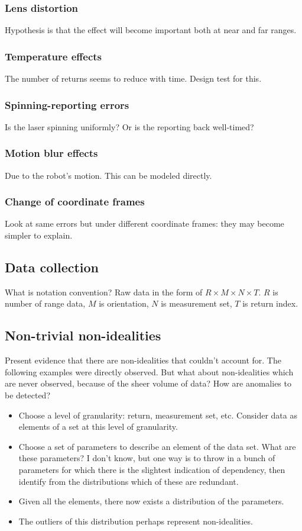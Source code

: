 \documentclass[a4paper, 11pt]{article}
\begin{document}
\subsubsection*{Lens distortion}
Hypothesis is that the effect will become important both at near and far ranges. 

\subsubsection*{Temperature effects}
The number of returns seems to reduce with time. Design test for this.

\subsubsection*{Spinning-reporting errors}
Is the laser spinning uniformly? Or is the reporting back well-timed?

\subsubsection*{Motion blur effects}
Due to the robot's motion. This can be modeled directly.

\subsubsection*{Change of coordinate frames}
Look at same errors but under different coordinate frames: they may become simpler to explain.

\subsection{Data collection}
What is notation convention? Raw data in the form of $R\times M\times N\times T$. $R$ is number of range data, $M$ is orientation, $N$ is measurement set, $T$ is return index. 

\subsection{Non-trivial non-idealities}
Present evidence that there are non-idealities that couldn't account for. The following examples were directly observed. But what about non-idealities which are never observed, because of the sheer volume of data? How are anomalies to be detected? 
  \begin{itemize}
    \item Choose a level of granularity: return, measurement set, etc. Consider data as elements of a set at this level of granularity.
    \item Choose a set of parameters to describe an element of the data set. What are these parameters? I don't know, but one way is to throw in a bunch of parameters for which there is the slightest indication of dependency, then identify from the distributions which of these are redundant.
    \item Given all the elements, there now exists a distribution of the parameters. 
    \item The outliers of this distribution perhaps represent non-idealities. 
  \end{itemize}
\end{document}
